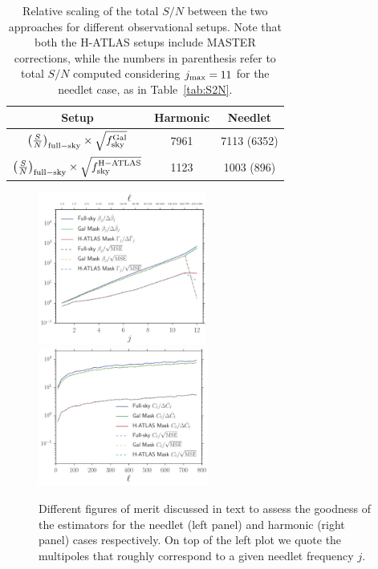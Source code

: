 \documentclass[a4paper,11pt]{article}
\begin{document}
%
\begin{table}[t]
\centering
\caption{Relative scaling of the total $S/N$  between the two approaches for different observational setups. Note that both the H-ATLAS setups include MASTER corrections, while the numbers in parenthesis refer to total $S/N$ computed considering $j_{\rm max}=11$ for the needlet case, as in Table~\ref{tab:S2N}.}
\begin{tabular}{ccc}
\toprule
\midrule
Setup & Harmonic & Needlet \\
\midrule
$\left(\frac{S}{N}\right)_{\rm full-sky}\times \sqrt{f_{\rm sky}^{\rm Gal}}$ & 7961 & 7113 (6352) \\
$\left(\frac{S}{N}\right)_{\rm full-sky}\times \sqrt{f_{\rm sky}^{\rm H-ATLAS}}$ & 1123 & 1003 (896) \\
\bottomrule
\end{tabular}
\label{tab:S2N_fsky}
\end{table}
%
\begin{figure}[tbp]
\centering %
  \includegraphics[width=0.49\textwidth]{images/metric_betaj.pdf}
  \includegraphics[width=0.5\textwidth]{images/metric_cl.pdf}
\caption{\label{fig:metric} Different figures of merit discussed in text to assess the goodness of the estimators for the needlet (left panel) and harmonic (right panel) cases respectively. On top of the left plot
we quote the multipoles that roughly correspond to a given needlet frequency $j$.}
\end{figure}
%
\end{document}
